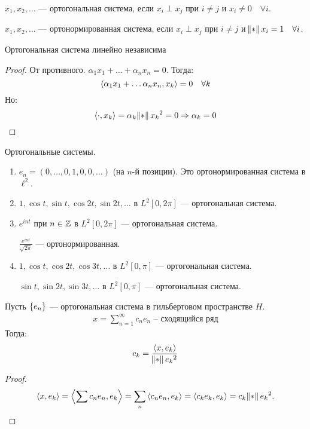 \begin{definition}
    $x_1, x_2, \ldots$ --- ортогональная система, если $x_i \perp x_j$ при $i \neq j$ и $x_i \neq 0 \quad \forall i$.
\end{definition}
\begin{definition}
    $x_1, x_2, \ldots$ --- ортонормированная система, если $x_i \perp x_j$ при $i \neq j$ и $\norm{x_i} = 1\quad \forall i$.
\end{definition}

\begin{observation}
    Ортогональная система линейно независима
\end{observation}
\begin{proof}
    От противного. $\alpha_1 x_1 + \ldots + \alpha_n x_n = 0$. Тогда:
    $$\left\langle \alpha_1 x_1 + \ldots \alpha_n x_n, x_k \right\rangle = 0 \quad \forall k$$
    Но: 
    $$\dotprod{\cdot}{x_k} = \alpha_k \norm{x_k}^2 = 0 \Rightarrow \alpha_k = 0$$
\end{proof}

\begin{examples} Ортогональные системы.
    \begin{enumerate}
        \item $e_n = (0, \ldots, 0, 1, 0, 0, \ldots)$ (на $n$-й позиции). Это ортонормированная система в $\ell^2$.
        \item $1, \cos t, \sin t, \cos 2t, \sin 2t, \ldots$ в $L^2[0, 2\pi]$ --- ортогональная система.
        \item $e^{i n t}$ при $n \in \mathbb{Z}$ в $L^2[0, 2\pi]$ --- ортогональная система.

              $\frac{e^{int}}{\sqrt{2\pi}}$ --- ортонормированная.
        \item $1, \cos t, \cos 2t, \cos 3t, \ldots$ в $L^2[0, \pi]$ --- ортогональная система.

              $\sin t, \sin 2t, \sin 3t, \ldots$ в $L^2[0, \pi]$ --- ортогональная система.
    \end{enumerate}
\end{examples}

\begin{theorem}
    Пусть $\set{e_n}$ --- ортогональная система в гильбертовом пространстве $H$.
    \begin{gather*}
        x = \sum\limits_{n=1}^\infty c_n e_n \text{ -- сходящийся ряд}
    \end{gather*}
    Тогда: 
    $$c_k = \dfrac{\dotprod{x}{e_k}}{\norm{e_k}^2}$$
\end{theorem}
\begin{proof}
    \[
        \dotprod{x}{e_k} = \dotprod{\sum c_n e_n}{e_k} = \sum\limits_n \dotprod{c_n e_n}{e_k} = \dotprod{c_k e_k}{e_k} = c_k \norm{e_k}^2
        .\]
\end{proof}

